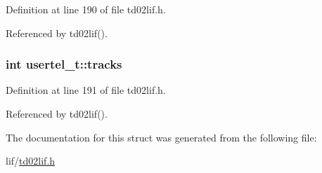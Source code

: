 Definition at line 190 of file td02lif.\+h.



Referenced by td02lif().

\subsubsection[{\texorpdfstring{tracks}{tracks}}]{\setlength{\rightskip}{0pt plus 5cm}int usertel\+\_\+t\+::tracks}\hypertarget{structusertel__t_afed111258495fd9c166720335613252f}{}\label{structusertel__t_afed111258495fd9c166720335613252f}


Definition at line 191 of file td02lif.\+h.



Referenced by td02lif().



The documentation for this struct was generated from the following file\+:\begin{DoxyCompactItemize}
\item 
lif/\hyperlink{td02lif_8h}{td02lif.\+h}\end{DoxyCompactItemize}
